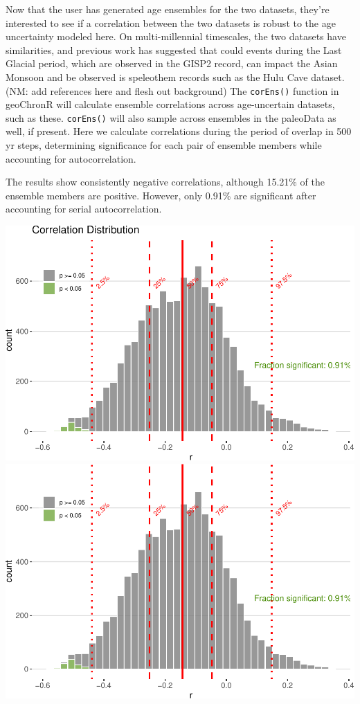 \documentclass[gc, manuscript]{copernicus}
\begin{document}
Now that the user has generated age ensembles for the two datasets,
they're interested to see if a correlation between the two datasets is
robust to the age uncertainty modeled here. On multi-millennial
timescales, the two datasets have similarities, and previous work has
suggested that could events during the Last Glacial period, which are
observed in the GISP2 record, can impact the Asian Monsoon and be
observed is speleothem records such as the Hulu Cave dataset. (NM: add
references here and flesh out background) The \texttt{corEns()} function
in geoChronR will calculate ensemble correlations across age-uncertain
datasets, such as these. \texttt{corEns()} will also sample across
ensembles in the paleoData as well, if present. Here we calculate
correlations during the period of overlap in 500 yr steps, determining
significance for each pair of ensemble members while accounting for
autocorrelation.

The results show consistently negative correlations, although 15.21\% of
the ensemble members are positive. However, only 0.91\% are significant
after accounting for serial autocorrelation.

\includegraphics{geoChronR-paper_files/figure-latex/unnamed-chunk-7-1.pdf}
\includegraphics{geoChronR-paper_files/figure-latex/unnamed-chunk-7-2.pdf}
\end{document}
